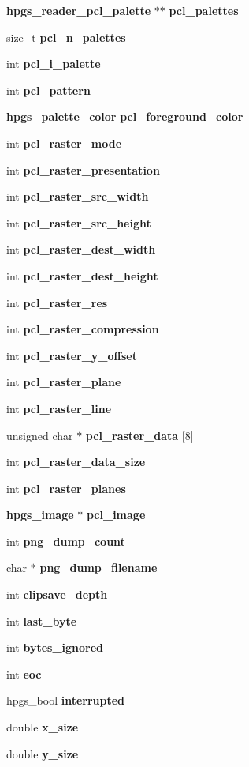 \begin{CompactItemize}
{\bf hpgs\_\-reader\_\-pcl\_\-palette} $\ast$$\ast$ {\bf pcl\_\-palettes}
\item 
size\_\-t {\bf pcl\_\-n\_\-palettes}
\item 
int {\bf pcl\_\-i\_\-palette}
\item 
int {\bf pcl\_\-pattern}
\item 
{\bf hpgs\_\-palette\_\-color} {\bf pcl\_\-foreground\_\-color}
\item 
int {\bf pcl\_\-raster\_\-mode}
\item 
int {\bf pcl\_\-raster\_\-presentation}
\item 
int {\bf pcl\_\-raster\_\-src\_\-width}
\item 
int {\bf pcl\_\-raster\_\-src\_\-height}
\item 
int {\bf pcl\_\-raster\_\-dest\_\-width}
\item 
int {\bf pcl\_\-raster\_\-dest\_\-height}
\item 
int {\bf pcl\_\-raster\_\-res}
\item 
int {\bf pcl\_\-raster\_\-compression}
\item 
int {\bf pcl\_\-raster\_\-y\_\-offset}
\item 
int {\bf pcl\_\-raster\_\-plane}
\item 
int {\bf pcl\_\-raster\_\-line}
\item 
unsigned char $\ast$ {\bf pcl\_\-raster\_\-data} [8]
\item 
int {\bf pcl\_\-raster\_\-data\_\-size}
\item 
int {\bf pcl\_\-raster\_\-planes}
\item 
{\bf hpgs\_\-image} $\ast$ {\bf pcl\_\-image}
\item 
int {\bf png\_\-dump\_\-count}
\item 
char $\ast$ {\bf png\_\-dump\_\-filename}
\item 
int {\bf clipsave\_\-depth}
\item 
int {\bf last\_\-byte}
\item 
int {\bf bytes\_\-ignored}
\item 
int {\bf eoc}
\item 
hpgs\_\-bool {\bf interrupted}
\end{CompactItemize}
\begin{Indent}{\bf }\par
\begin{CompactItemize}
\item 
double {\bf x\_\-size}
\item 
double \textbf{y\_\-size}\label{structhpgs__reader__st_6596945c1dba7e48b3c9193a0e549c8f}

\end{CompactItemize}
\end{Indent}
